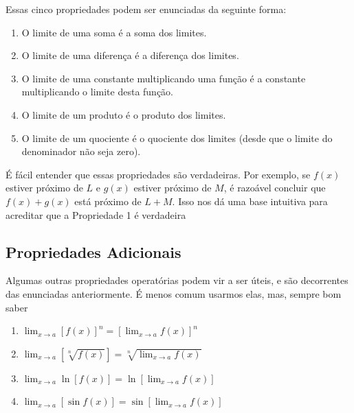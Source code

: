 \documentclass{article}
\begin{document}
Essas cinco propriedades podem ser enunciadas da seguinte forma:
 
\begin{enumerate}
    \item O limite de uma soma é a soma dos limites.
    \item O limite de uma diferença é a diferença dos limites.
    \item O limite de uma constante multiplicando uma função é a constante multiplicando o limite desta função.
    \item O limite de um produto é o produto dos limites.
    \item O limite de um quociente é o quociente dos limites (desde que o limite do denominador não seja zero).
\end{enumerate}
 
É fácil entender que essas propriedades são verdadeiras. Por exemplo, se $f(x)$ estiver próximo de $L$ e $g(x)$ estiver próximo de $M$, é razoável concluir que $f(x) + g(x)$ está próximo de $L + M$. Isso nos dá uma base intuitiva para acreditar que a Propriedade 1 é verdadeira

\subsection{Propriedades Adicionais}
Algumas outras propriedades operatórias podem vir a ser úteis, e são decorrentes das enunciadas anteriormente. É menos comum usarmos elas, mas, sempre bom saber
\begin{enumerate}
    \item $\displaystyle \lim_{x \to a} [f(x)]^n = [\lim_{x \to a} f(x)]^n$

    \item $\displaystyle \lim_{x \to a} [\sqrt[n]{f(x)}] = \sqrt[n]{\lim_{x \to a} f(x)}$

    \item $\displaystyle \lim_{x \to a} \ln[{f(x)}] = \ln[{\lim_{x \to a} f(x)}]$

    \item $\displaystyle \lim_{x \to a} [\sin {f(x)}] = \sin[{\lim_{x \to a} f(x)}]$
\end{enumerate}
\end{document}
